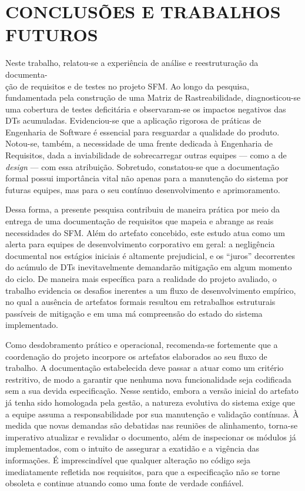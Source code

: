 \section{CONCLUSÕES E TRABALHOS FUTUROS}
\label{sec:conclusao}

Neste trabalho, relatou-se a experiência de análise e reestruturação da documenta-\\ção de requisitos e de testes no projeto SFM. Ao longo da pesquisa, fundamentada pela construção de uma Matriz de Rastreabilidade, diagnosticou-se uma cobertura de testes deficitária e observaram-se os impactos negativos das DTs acumuladas. Evidenciou-se que a aplicação rigorosa de práticas de Engenharia de Software é essencial para resguardar a qualidade do produto. Notou-se, também, a necessidade de uma frente dedicada à Engenharia de Requisitos, dada a inviabilidade de sobrecarregar outras equipes — como a de \textit{design} — com essa atribuição. Sobretudo, constatou-se que a documentação formal possui importância vital não apenas para a manutenção do sistema por futuras equipes, mas para o seu contínuo desenvolvimento e aprimoramento.

Dessa forma, a presente pesquisa contribuiu de maneira prática por meio da entrega de uma documentação de requisitos que mapeia e abrange as reais necessidades do SFM. Além do artefato concebido, este estudo atua como um alerta para equipes de desenvolvimento corporativo em geral: a negligência documental nos estágios iniciais é altamente prejudicial, e os ``juros'' decorrentes do acúmulo de DTs inevitavelmente demandarão mitigação em algum momento do ciclo. De maneira mais específica para a realidade do projeto avaliado, o trabalho evidencia os desafios inerentes a um fluxo de desenvolvimento empírico, no qual a ausência de artefatos formais resultou em retrabalhos estruturais passíveis de mitigação e em uma má compreensão do estado do sistema implementado. 

Como desdobramento prático e operacional, recomenda-se fortemente que a coordenação do projeto incorpore os artefatos elaborados ao seu fluxo de trabalho. A documentação estabelecida deve passar a atuar como um critério restritivo, de modo a garantir que nenhuma nova funcionalidade seja codificada sem a sua devida especificação. Nesse sentido, embora a versão inicial do artefato já tenha sido homologada pela gestão, a natureza evolutiva do sistema exige que a equipe assuma a responsabilidade por sua manutenção e validação contínuas. À medida que novas demandas são debatidas nas reuniões de alinhamento, torna-se imperativo atualizar e revalidar o documento, além de inspecionar os módulos já implementados, com o intuito de assegurar a exatidão e a vigência das informações. É imprescindível que qualquer alteração no código seja imediatamente refletida nos requisitos, para que a especificação não se torne obsoleta e continue atuando como uma fonte de verdade confiável.

